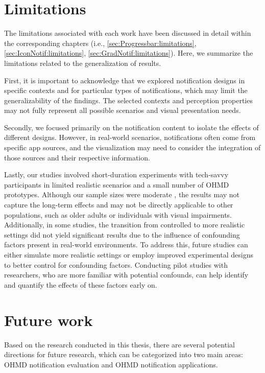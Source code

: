 \section{Limitations}

The limitations associated with each work have been discussed in detail within the corresponding chapters (i.e., \autoref{sec:Progressbar:limitations}, \autoref{sec:IconNotif:limitations}, \autoref{sec:GradNotif:limitations}). Here, we summarize the limitations related to the generalization of results.

First, it is important to acknowledge that we explored notification designs in specific contexts and for particular types of notifications, which may limit the generalizability of the findings. The selected contexts and perception properties may not fully represent all possible scenarios and visual presentation needs.

Secondly, we focused primarily on the notification content to isolate the effects of different designs. However, in real-world scenarios, notifications often come from specific app sources, and the visualization may need to consider the integration of those sources and their respective information.

Lastly, our studies involved short-duration experiments with tech-savvy participants in limited realistic scenarios and a small number of OHMD prototypes. Although our sample sizes were moderate \cite{caine_local_2016}, the results may not capture the long-term effects and may not be directly applicable to other populations, such as older adults or individuals with visual impairments. Additionally, in some studies, the transition from controlled to more realistic settings did not yield significant results due to the influence of confounding factors present in real-world environments. To address this, future studies can either simulate more realistic settings or employ improved experimental designs to better control for confounding factors. Conducting pilot studies with researchers, who are more familiar with potential confounds, can help identify and quantify the effects of these factors early on.





\section{Future work}
\label{sec:future_work}

Based on the research conducted in this thesis, there are several potential directions for future research, which can be categorized into two main areas: OHMD notification evaluation and OHMD notification applications.


